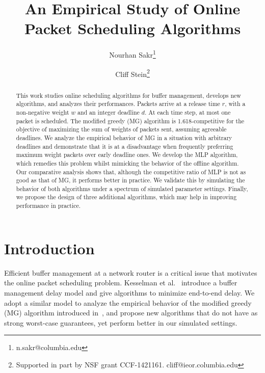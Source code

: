 \documentclass[oribibl]{llncs}
\begin{document}
\title{An Empirical Study of Online Packet Scheduling Algorithms}
\author{Nourhan Sakr\thanks{n.sakr@columbia.edu} \and Cliff Stein\thanks{Supported in part by NSF grant CCF-1421161. cliff@ieor.columbia.edu}}

\maketitle


\begin{abstract}

This work studies online scheduling algorithms for
buffer management, develops new algorithms,
and analyzes their performances. Packets arrive at a release time
$r$, with a non-negative weight $w$ and an integer deadline $d$.
At each time step, at most one packet is
scheduled. The modified greedy (MG) algorithm is 1.618-competitive for
the objective of maximizing the sum of weights of packets sent, assuming
agreeable deadlines. We
analyze the empirical behavior of MG in a situation with arbitrary deadlines and demonstrate that it is at a
disadvantage when frequently preferring maximum weight packets over
early deadline ones. We develop the MLP algorithm, which remedies this
problem whilst mimicking the behavior of the offline algorithm. Our
comparative analysis shows that, although the competitive ratio of MLP is not as good as that of MG, it performs better in practice. We validate this by
simulating the behavior of both algorithms under a
spectrum of simulated parameter settings. Finally, we propose the design of
three additional algorithms, which may help in
improving performance in practice.

\end{abstract}

\section{Introduction}
\label{sec:Introduction}


Efficient buffer management at a network router is a critical issue
that motivates the online packet scheduling problem. Kesselman et
al.~\cite{kesselman04} introduce a buffer management delay model and
give algorithms to minimize end-to-end delay.  We adopt a similar
model to analyze the empirical behavior of the modified greedy (MG)
algorithm introduced in~\cite{jez12}, and propose new algorithms that do not have 
as strong worst-case guarantees, yet perform better in our
simulated settings.
\end{document}
